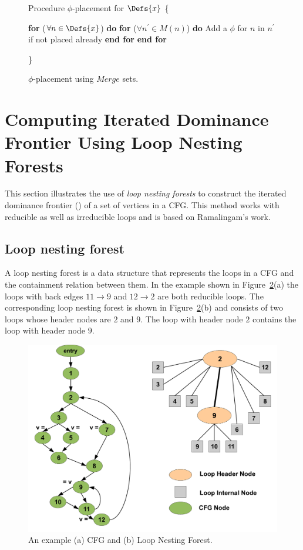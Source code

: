 {\begin{figure}[!ht]
\begin{minipage}[t]{5in}
\setcounter{linectr}{0}

Procedure $\phi$-placement for $\Defs{x}$
\{
\begin{code}
 {\bf for} ($\forall n \in \Defs{x}$) {\bf do}
   {\bf for} ($\forall n^{'} \in M(n)$) {\bf do}
       Add a $\phi$ for $n$ in $n^{'}$ if not placed already
   {\bf end for}
 {\bf end for}
\end{code}
\}
\end{minipage}
\caption{$\phi$-placement using $Merge$ sets.}
\label{F:phip}
\end{figure} 


\section{Computing Iterated Dominance Frontier Using Loop Nesting Forests}
\label{section:alternative_ssa_construction_algorithms:loop}
This section illustrates the use of \emph{loop nesting forests} to construct 
the iterated dominance frontier (\iDF) of a set of vertices in a CFG. This 
method works with reducible as well as irreducible loops and is based on 
Ramalingam's work.


\subsection{Loop nesting forest}
A loop nesting forest is a data structure that represents the loops in a CFG 
and the containment relation between them. In the example shown in 
Figure~\ref{fig:lnf}(a) the loops with back edges $11 \rightarrow 9$ and $12 \rightarrow 2$ are both reducible loops. The corresponding loop nesting forest is shown in Figure~\ref{fig:lnf}(b) and consists of two loops whose header nodes are $2$ and $9$. The loop with header node $2$ contains the loop with header node $9$.

    \begin{figure}[htb]
    \centerline{\includegraphics[scale=0.3]{lnfred.pdf}}
    \caption{An example (a) CFG and (b) Loop Nesting Forest.}
    \label{fig:lnf}
    \end{figure} 


}
